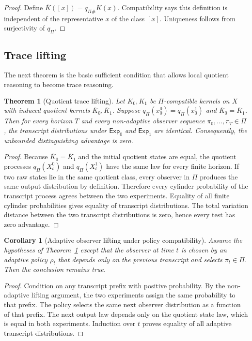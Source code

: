 \documentclass[11pt]{article}
\theoremstyle{definition}
\theoremstyle{plain}
\newtheorem{theorem}[definition]{Theorem}
\newtheorem{corollary}[definition]{Corollary}
\theoremstyle{remark}
\begin{document}
\begin{proof}
Define $\bar K([x])=q_{\Pi\#}K(x)$. Compatibility says this definition is independent of the representative $x$ of the class $[x]$. Uniqueness follows from surjectivity of $q_{\Pi}$.
\end{proof}

\subsection{Trace lifting}

The next theorem is the basic sufficient condition that allows local quotient reasoning to become trace reasoning.

\begin{theorem}[Quotient trace lifting]\label{thm:trace-lifting}
Let $K_0,K_1$ be $\Pi$-compatible kernels on $X$ with induced quotient kernels $\bar K_0,\bar K_1$. Suppose $q_{\Pi}(x_0^0)=q_{\Pi}(x_0^1)$ and $\bar K_0=\bar K_1$. Then for every horizon $T$ and every non-adaptive observer sequence $\pi_0,\ldots,\pi_T\in\Pi$, the transcript distributions under $\mathsf{Exp}_0$ and $\mathsf{Exp}_1$ are identical. Consequently, the unbounded distinguishing advantage is zero.
\end{theorem}

\begin{proof}
Because $\bar K_0=\bar K_1$ and the initial quotient states are equal, the quotient processes $q_{\Pi}(X_t^0)$ and $q_{\Pi}(X_t^1)$ have the same law for every finite horizon. If two raw states lie in the same quotient class, every observer in $\Pi$ produces the same output distribution by definition. Therefore every cylinder probability of the transcript process agrees between the two experiments. Equality of all finite cylinder probabilities gives equality of transcript distributions. The total variation distance between the two transcript distributions is zero, hence every test has zero advantage.
\end{proof}

\begin{corollary}[Adaptive observer lifting under policy compatibility]
Assume the hypotheses of Theorem~\ref{thm:trace-lifting} except that the observer at time $t$ is chosen by an adaptive policy $\rho_t$ that depends only on the previous transcript and selects $\pi_t\in\Pi$. Then the conclusion remains true.
\end{corollary}


\begin{proof}
Condition on any transcript prefix with positive probability. By the non-adaptive lifting argument, the two experiments assign the same probability to that prefix. The policy selects the same next observer distribution as a function of that prefix. The next output law depends only on the quotient state law, which is equal in both experiments. Induction over $t$ proves equality of all adaptive transcript distributions.
\end{proof}
\end{document}
